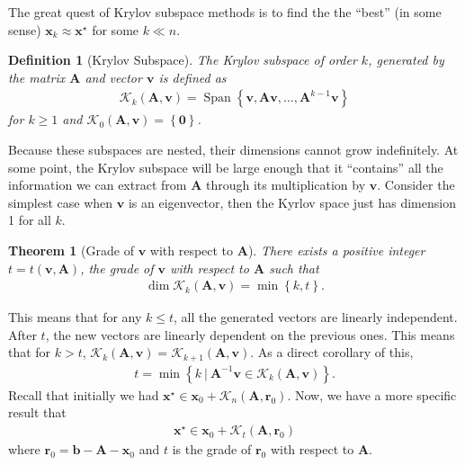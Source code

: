 \documentclass[12pt,a4paper]{article} %
\newtheorem*{theorem}{Theorem}
\newtheorem*{definition}{Definition}
\DeclareMathOperator{\Span}{Span}
\begin{document}
The great quest of Krylov subspace methods is to find the the ``best'' 
(in some sense)
$\bm x_k \approx \bm x^\star$ for some $k \ll n$.

\begin{definition}[Krylov Subspace]
    The Krylov subspace of order $k$, generated by the matrix $\mathbf A$ and 
    vector $\bm v$ is defined as 
    \begin{align*}
        \mathcal K_k(\mathbf A, \bm v) = \Span \left\{ \bm v, \mathbf A \bm v, 
        \ldots, \mathbf A^{k-1}\bm v\right\}
    \end{align*}
    for $k \ge 1$ and $\mathcal K_0(\mathbf A, \bm v) = \left\{ \bm 0\right\}$.
\end{definition}
Because these subspaces are nested, their dimensions cannot grow indefinitely.
At some point, the Krylov subspace will be large enough that it 
``contains'' all the information we can extract from $\mathbf A$ through its 
multiplication by $\bm v$. Consider the simplest case when $\bm v$ is an eigenvector, 
then the Kyrlov space just has dimension 1 for all $k$.
\begin{theorem}[Grade of $\bm v$ with respect to $\mathbf A$]
    There exists a positive integer $t = t(\bm v, \mathbf A)$, the grade of 
    $\bm v$ with respect to $\mathbf A$ such that 
    \begin{align*}
        \dim \mathcal K_k (\mathbf A, \bm v) = \min \left\{ k, t\right\}.
    \end{align*}
\end{theorem}
This means that for any $k \le t$, all the generated vectors are linearly independent. After 
$t$, the new vectors are linearly dependent on the previous ones. This means that 
for $k > t$, $\mathcal K_k (\mathbf A, \bm v) = \mathcal K_{k+1} (\mathbf A, \bm v)$.
As a direct corollary of this, 
\begin{align*}
    t = \min \left\{ k ~|~ \mathbf A^{-1}\bm v \in \mathcal K_k (\mathbf A, \bm v)\right\}.
\end{align*}
Recall that initially we had 
$\bm x^\star \in \bm x_0 + \mathcal K_n (\mathbf A, \bm r_0)$.
Now, we have a more specific result that 
\begin{align*}
    \bm x^\star \in \bm x_0 + \mathcal K_t (\mathbf A, \bm r_0)
\end{align*}
where $\bm r_0 = \bm b - \mathbf A - \bm x_0$ and $t$ is the grade of 
$\bm r_0$ with respect to $\mathbf A$.
\end{document}
